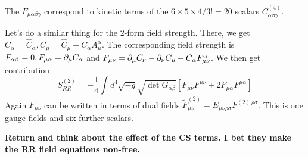 \documentclass[11pt, class=article, crop=false]{standalone}
\begin{document}
\begin{enumerate}
	The $F_{\mu \alpha \beta \gamma}$ correspond to kinetic terms of the $6 \times 5 \times 4/3! = 20$ scalars $C^{(4)}_{\alpha \beta \gamma}$.
	
	Let's do a similar thing for the $2$-form field strength. There, we get $C_\alpha = \hat C_\alpha, C_\mu = \hat C_\mu - C_{\alpha} A^\alpha_\mu$. The corresponding field strength is $F_{\alpha \beta} = 0, F_{\mu \alpha} = \partial_\mu C_\alpha$ and $F_{\mu \nu} = \partial_\mu C_{\nu} - \partial_\nu C_{\mu} + C_{\alpha} F^\alpha_{\mu \nu}$. We then get contribution 
	\[
		S_{RR}^{(2)} = -\frac{1}{4} \int d^4 \sqrt{-g} \sqrt{\det G_{\alpha \beta}} [F_{\mu \nu} F^{\mu \nu} + 2 F_{\mu \alpha} F^{\mu \alpha}]
	\]
	Again $F_{\mu \nu}$ can be written in terms of dual fields $\tilde F^{(2)}_{\mu \nu} = E_{\mu \nu \rho \sigma} F^{(2) \, \rho \sigma}$. This is one gauge fields and six further scalars. 
	
	\textbf{Return and think about the effect of the CS terms. I bet they  make the RR field equations non-free.}


\end{enumerate}
\end{document}
